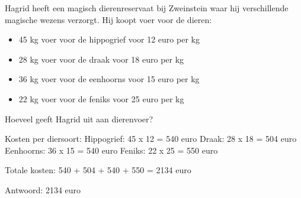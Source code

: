 \begin{opgave}
Hagrid heeft een magisch dierenreservaat bij Zweinstein waar hij verschillende 
magische wezens verzorgt. Hij koopt voer voor de dieren:
\begin{itemize}
\item 45 kg voer voor de hippogrief voor 12 euro per kg
\item 28 kg voer voor de draak voor 18 euro per kg  
\item 36 kg voer voor de eenhoorns voor 15 euro per kg
\item 22 kg voer voor de feniks voor 25 euro per kg
\end{itemize}
Hoeveel geeft Hagrid uit aan dierenvoer?
\end{opgave}

\begin{oplossing}
Kosten per diersoort:
Hippogrief: 45 x 12 = 540 euro
Draak: 28 x 18 = 504 euro
Eenhoorns: 36 x 15 = 540 euro
Feniks: 22 x 25 = 550 euro

Totale kosten:
540 + 504 + 540 + 550 = 2134 euro

Antwoord: 2134 euro
\end{oplossing}